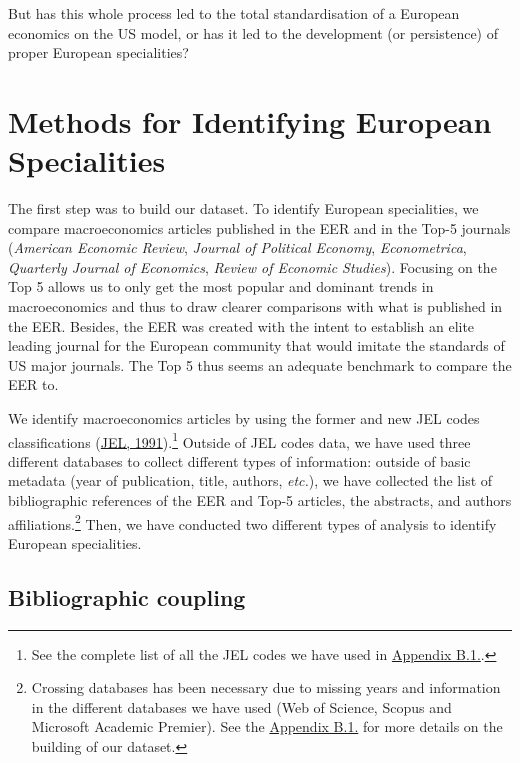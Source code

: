\documentclass[]{elsarticle} %
\begin{document}
But has this whole process led to the total standardisation of a
European economics on the US model, or has it led to the development (or
persistence) of proper European specialities?

\hypertarget{methods}{%
\section{Methods for Identifying European Specialities}\label{methods}}

The first step was to build our dataset. To identify European
specialities, we compare macroeconomics articles published in the EER
and in the Top-5 journals (\emph{American Economic Review},
\emph{Journal of Political Economy}, \emph{Econometrica},
\emph{Quarterly Journal of Economics}, \emph{Review of Economic
Studies}). Focusing on the Top 5 allows us to only get the most popular
and dominant trends in macroeconomics and thus to draw clearer
comparisons with what is published in the EER. Besides, the EER was
created with the intent to establish an elite leading journal for the
European community that would imitate the standards of US major
journals. The Top 5 thus seems an adequate benchmark to compare the EER
to.

We identify macroeconomics articles by using the former and new JEL
codes classifications (\protect\hyperlink{ref-jel1991}{JEL,
1991}).\footnote{See the complete list of all the JEL codes we have used
  in \protect\hyperlink{eer-top5-macro}{Appendix B.1.}.} Outside of JEL
codes data, we have used three different databases to collect different
types of information: outside of basic metadata (year of publication,
title, authors, \emph{etc.}), we have collected the list of
bibliographic references of the EER and Top-5 articles, the abstracts,
and authors affiliations.\footnote{Crossing databases has been necessary
  due to missing years and information in the different databases we
  have used (Web of Science, Scopus and Microsoft Academic Premier). See
  the \protect\hyperlink{corpus}{Appendix B.1.} for more details on the
  building of our dataset.} Then, we have conducted two different types
of analysis to identify European specialities.

\hypertarget{bibliographic-coupling}{%
\subsection{Bibliographic coupling}\label{bibliographic-coupling}}
\end{document}
